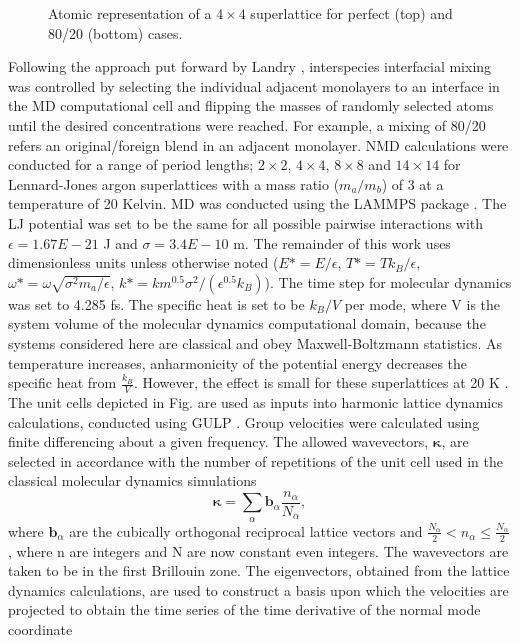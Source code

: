 \documentclass[aps,prb,preprint,preprintnumbers,amsmath,amssymb,floatfix,superscriptaddress]{revtex4}
\begin{document}
\begin{figure*}[ht!]
\begin{center}
\renewcommand{\figure}{Fig.}
\caption{Atomic representation of a $4\times4$ superlattice for perfect (top) and 80/20 (bottom) cases.}
\label{fig:dispersion}
\end{center}
\end{figure*}

Following the approach put forward by Landry \cite{PhysRevB.79.075316}, interspecies interfacial mixing was controlled by selecting the individual adjacent monolayers to an interface in the MD computational cell and flipping the masses of randomly selected atoms until the desired concentrations were reached. For example, a mixing of 80/20 refers an original/foreign blend in an adjacent monolayer. NMD calculations were conducted for a range of period lengths; $2\times2$, $4\times4$, $8\times8$ and $14\times14$ for Lennard-Jones argon superlattices with a mass ratio ($m_a/m_b$) of 3 at a temperature of 20 Kelvin. MD was conducted using the LAMMPS package \cite{LAMMPS}. The LJ potential was set to be the same for all possible pairwise interactions with $\epsilon= 1.67E-21$ J and $\sigma= 3.4E-10$ m. The remainder of this work uses dimensionless units unless otherwise noted ($E*=E/\epsilon$, $T*=Tk_B/\epsilon$, $\omega*=\omega\sqrt{\sigma^2m_a/\epsilon}$, $k*=km^{0.5}\sigma^2/(\epsilon^{0.5}k_B)$). The time step for molecular dynamics was set to 4.285 fs. The specific heat is set to be $k_B/V$ per mode, where V is the system volume of the molecular dynamics computational domain, because the systems considered here are classical and obey Maxwell-Boltzmann statistics. As temperature increases, anharmonicity of the potential energy decreases the specific heat from $\frac{k_B}{V}$. However, the effect is small for these superlattices at 20 K \cite{Jason}. The unit cells depicted in Fig. are used as inputs into harmonic lattice dynamics calculations, conducted using GULP \cite{GULP}. Group velocities were calculated using finite differencing about a given frequency. The allowed wavevectors, $\pmb{\kappa}$, are selected in accordance with the number of repetitions of the unit cell used in the classical molecular dynamics simulations
\begin{equation}\label{EQ:NMD:allowdkpt}
\pmb{\kappa} = \sum_{\alpha} \pmb{b}_{\alpha} \frac{n_{\alpha}}{N_{\alpha}},
\end{equation}
where $\pmb{b}_\alpha$ are the cubically orthogonal reciprocal lattice vectors and $ \frac{N_\alpha}{2} < n_\alpha \le \frac {N_\alpha}{2}$, where n are integers and N are now constant even integers. The wavevectors are taken to be in the first Brillouin zone. The eigenvectors, obtained from the lattice dynamics calculations, are used to construct a basis upon which the velocities are projected to obtain the time series of the time derivative of the normal mode coordinate 
\end{document}
